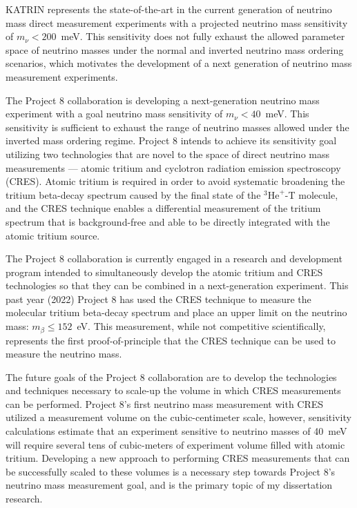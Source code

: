 KATRIN represents the state-of-the-art in the current generation of neutrino mass direct measurement experiments with a projected neutrino mass sensitivity  of $m_\nu < 200$~meV. This sensitivity does not fully exhaust the allowed parameter space of neutrino masses under the normal and inverted neutrino mass ordering scenarios, which motivates the development of a next generation of neutrino mass measurement experiments. 

The Project 8 collaboration is developing a next-generation neutrino mass experiment with a goal neutrino mass sensitivity of $m_\nu<40$~meV. This sensitivity is sufficient to exhaust the range of neutrino masses allowed under the inverted mass ordering regime. Project 8 intends to achieve its sensitivity goal utilizing two technologies that are novel to the space of direct neutrino mass measurements --- atomic tritium and cyclotron radiation emission spectroscopy (CRES). Atomic tritium is required in order to avoid systematic broadening the tritium beta-decay spectrum caused by the final state of the $^3\textrm{He}^+$-T molecule, and the CRES technique enables a differential measurement of the tritium spectrum that is background-free and able to be directly integrated with the atomic tritium source.

The Project 8 collaboration is currently engaged in a research and development program intended to simultaneously develop the atomic tritium and CRES technologies so that they can be combined in a next-generation experiment. This past year (2022) Project 8 has used the CRES technique to measure the molecular tritium beta-decay spectrum and place an upper limit on the neutrino mass: $m_\beta\leq152$~eV. This measurement, while not competitive scientifically, represents the first proof-of-principle that the CRES technique can be used to measure the neutrino mass.

The future goals of the Project 8 collaboration are to develop the technologies and techniques necessary to scale-up the volume in which CRES measurements can be performed. Project 8's first neutrino mass measurement with CRES utilized a measurement volume on the cubic-centimeter scale, however, sensitivity calculations estimate that an experiment sensitive to neutrino masses of 40~meV will require several tens of cubic-meters of experiment volume filled with atomic tritium. Developing a new approach to performing CRES measurements that can be successfully scaled to these volumes is a necessary step towards Project 8's neutrino mass measurement goal, and is the primary topic of my dissertation research.

